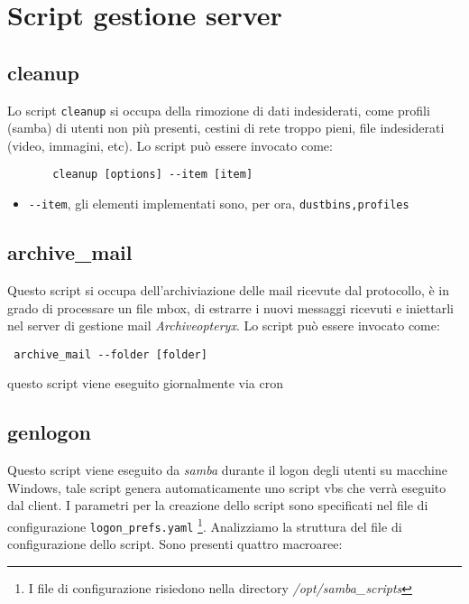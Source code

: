 \documentclass[a4paper,10pt,oneside]{memoir}
\begin{document}
 \chapter{Script gestione server}
    \section*{cleanup}
      Lo script \verb#cleanup# si occupa della rimozione di dati indesiderati, come profili (samba) di utenti non più presenti, cestini di rete troppo pieni, file indesiderati (video, immagini, etc). Lo script può essere invocato come:
      \begin{verbatim}
       cleanup [options] --item [item]
      \end{verbatim}
      \begin{itemize}
	\item \verb#--item#, gli elementi implementati sono, per ora, \verb#dustbins,profiles#  
      \end{itemize}
\section*{archive\_mail}

Questo script si occupa dell'archiviazione delle mail ricevute dal protocollo, è in grado di processare un file mbox, di estrarre i nuovi messaggi ricevuti e iniettarli nel server di gestione mail \emph{Archiveopteryx}. Lo script può essere invocato come:
\begin{verbatim}
 archive_mail --folder [folder]
\end{verbatim}
questo script viene eseguito giornalmente via cron
\section*{genlogon}
Questo script viene eseguito da \emph{samba} durante il logon degli utenti su macchine Windows, tale script genera automaticamente uno script vbs che verrà eseguito dal client. I parametri per la creazione dello script sono specificati nel file di configurazione \verb#logon_prefs.yaml# \footnote{I file di configurazione risiedono nella directory \emph{/opt/samba\_scripts}}.
Analizziamo la struttura del file di configurazione dello script. Sono presenti quattro macroaree:
\end{document}
